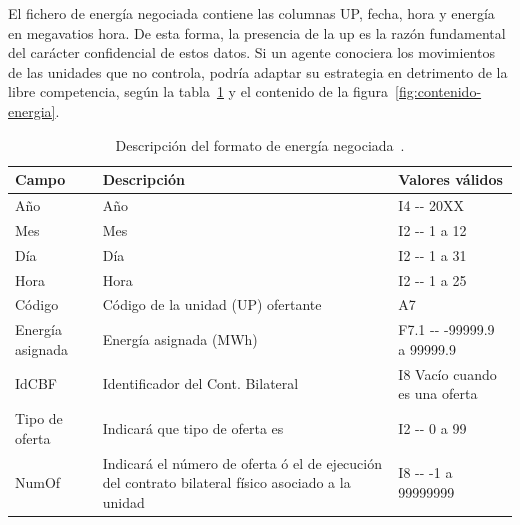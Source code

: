 El fichero de energía negociada contiene las columnas UP, fecha, hora y energía en megavatios hora. De esta forma, la presencia de la \gls{up} es la razón fundamental del carácter confidencial de estos datos. Si un agente conociera los movimientos de las unidades que no controla, podría adaptar su estrategia en detrimento de la libre competencia, según la tabla~\ref{tab:descripción-energia} y el contenido de la figura~\ref{fig:contenido-energia}.

\begin{table}[ht]
  \centering
  \begin{tabular}{|l|p{5cm}|l|}
    \hline
    Campo             & Descripción                                                                                       & Valores válidos                \\
    \hline
    Año               & Año                                                                                               & I4 {-}{-} 20XX                 \\
    Mes               & Mes                                                                                               & I2 {-}{-} 1 a 12               \\
    Día               & Día                                                                                               & I2 {-}{-} 1 a 31               \\
    Hora              & Hora                                                                                              & I2 {-}{-} 1 a 25               \\
    Código            & Código de la unidad (UP) ofertante                                                                & A7                             \\
    Energía asignada  & Energía asignada (MWh)                                                                            & F7.1 {-}{-} -99999.9 a 99999.9 \\
    IdCBF             & Identificador del Cont. Bilateral                                                                 & I8 Vacío cuando es una oferta  \\
    Tipo de oferta    & Indicará que tipo de oferta es                                                                    & I2 {-}{-} 0 a 99               \\
    NumOf             & Indicará el número de oferta ó el de ejecución del contrato bilateral físico asociado a la unidad & I8 {-}{-} -1 a 99999999        \\
    \hline
  \end{tabular}
  \caption[Descripción del formato de energía negociada.]{Descripción del formato de energía negociada~\cite{omie2025modelo}.}%
  \label{tab:descripción-energia}
\end{table}


